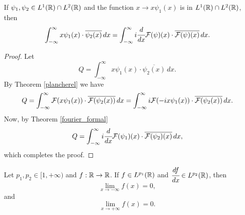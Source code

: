 \documentclass[main.tex]{subfiles}
\begin{document}
\begin{theorem}
\label{position_to_momentum}
If $\psi_1, \psi_2\in L^1(\mathbb{R}) \cap L^2(\mathbb{R})$ and the function $x\to x\psi_1(x)$ is in $L^{1}(\mathbb{R})\cap L^{2}(\mathbb{R})$, then
\begin{equation}
    \int_{-\infty}^{\infty} x\psi_1(x) \cdot \overline{\psi_2(x)}\, dx = \int_{-\infty}^{\infty} i\cfrac{d}{d x}\mathcal{F}(\psi)(x) \cdot \overline{\mathcal{F}(\psi)(x)} \,dx.
\end{equation}
\end{theorem}
\begin{proof}
Let 
\begin{equation}
    Q = \int_{-\infty}^{\infty} x\psi_1(x) \cdot \overline{\psi_2(x)}\, dx.
\end{equation}
By Theorem \ref{plancherel} we have
\begin{equation}
    Q = \int_{-\infty}^{\infty} \mathcal{F}(x\psi_1(x)) \cdot \overline{\mathcal{F}(\psi_2(x))}\, dx 
    = \int_{-\infty}^{\infty} i \mathcal{F}(-ix\psi_1(x)) \cdot \overline{\mathcal{F}(\psi_2(x))}\, dx. 
\end{equation}
Now, by Theorem \ref{fourier_formal}
\begin{equation}
    Q = \int_{-\infty}^{\infty} i\cfrac{d}{d x}\mathcal{F}(\psi_1)(x) \cdot \overline{\mathcal{F}(\psi_2)(x)} \,dx,
\end{equation}
which completes the proof.
\end{proof}
\begin{lemma}
Let $p_1, p_2\in[1,+\infty)$ and $f:\mathbb{R} \to \mathbb{R}$. If $f\in L^{p_1}(\mathbb{R})$ and $\cfrac{df}{dx}\in L^{p_2}(\mathbb{R})$, then
\begin{equation}
\lim_{x\to-\infty} f(x) = 0,
\end{equation}
and
\begin{equation}
    \lim_{x\to+\infty} f(x) = 0.
\end{equation}
\end{lemma}
\end{document}
